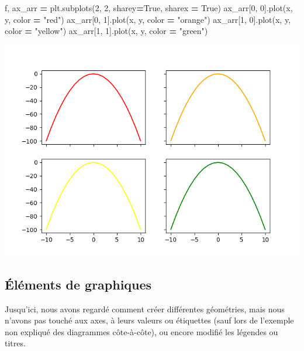 \documentclass[12pt,]{book}
\newenvironment{Shaded}{\begin{snugshade}}{\end{snugshade}}
\newcommand{\DecValTok}[1]{\textcolor[rgb]{0.00,0.00,0.81}{#1}}
\newcommand{\StringTok}[1]{\textcolor[rgb]{0.31,0.60,0.02}{#1}}
\newcommand{\VariableTok}[1]{\textcolor[rgb]{0.00,0.00,0.00}{#1}}
\newcommand{\OperatorTok}[1]{\textcolor[rgb]{0.81,0.36,0.00}{\textbf{#1}}}
\newcommand{\NormalTok}[1]{#1}
\numberwithin{equation}{section}
\numberwithin{countremarque}{section}
\begin{document}
\begin{Shaded}
\begin{Highlighting}[]
\NormalTok{f, ax_arr }\OperatorTok{=}\NormalTok{ plt.subplots(}\DecValTok{2}\NormalTok{, }\DecValTok{2}\NormalTok{, sharey}\OperatorTok{=}\VariableTok{True}\NormalTok{, sharex }\OperatorTok{=} \VariableTok{True}\NormalTok{)}
\NormalTok{ax_arr[}\DecValTok{0}\NormalTok{, }\DecValTok{0}\NormalTok{].plot(x, y, color }\OperatorTok{=} \StringTok{"red"}\NormalTok{)}
\NormalTok{ax_arr[}\DecValTok{0}\NormalTok{, }\DecValTok{1}\NormalTok{].plot(x, y, color }\OperatorTok{=} \StringTok{"orange"}\NormalTok{)}
\NormalTok{ax_arr[}\DecValTok{1}\NormalTok{, }\DecValTok{0}\NormalTok{].plot(x, y, color }\OperatorTok{=} \StringTok{"yellow"}\NormalTok{)}
\NormalTok{ax_arr[}\DecValTok{1}\NormalTok{, }\DecValTok{1}\NormalTok{].plot(x, y, color }\OperatorTok{=} \StringTok{"green"}\NormalTok{)}
\end{Highlighting}
\end{Shaded}

\begin{center}\includegraphics[width=9.03in]{figs/pyplot/subplots_share} \end{center}

\subsection{Éléments de graphiques}\label{pyplot-elements-graphiques}

Jusqu'ici, nous avons regardé comment créer différentes géométries, mais
nous n'avons pas touché aux axes, à leurs valeurs ou étiquettes (sauf
lors de l'exemple non expliqué des diagrammes côte-à-côte), ou encore
modifié les légendes ou titres.
\end{document}
